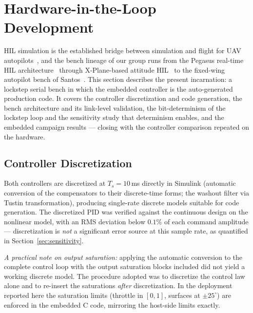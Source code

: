 \section{Hardware-in-the-Loop Development}
\label{sec:hil}
HIL simulation is the established bridge between simulation and
flight for UAV autopilots~\cite{jung2007hil,cai2009design}, and the
bench lineage of our group runs from the Pegasus real-time HIL
architecture~\cite{bittar2012pegasus} through X-Plane-based attitude
HIL~\cite{bittar2014hil} to the fixed-wing autopilot bench of
Santos~\cite{santos2018}. This section describes the present
incarnation: a lockstep serial bench in which the embedded controller
is the auto-generated production code. It covers the controller
discretization and code generation, the bench architecture and its
link-level validation, the bit-determinism of the lockstep loop and
the sensitivity study that determinism enables, and the embedded
campaign results --- closing with the controller comparison repeated
on the hardware.

\subsection{Controller Discretization}
\label{sec:discretization}
Both controllers are discretized at $T_s = 10$\,ms directly in Simulink
(automatic conversion of the compensators to their discrete-time forms;
the washout filter via Tustin transformation), producing single-rate
discrete models suitable for code generation. The discretized PID was
verified against the continuous design on the nonlinear model, with an RMS
deviation below $0.1\%$ of each command amplitude --- discretization is
\emph{not} a significant error source at this sample rate, as quantified
in Section~\ref{sec:sensitivity}.

\emph{A practical note on output saturation:} applying the automatic
conversion to the complete control loop with the output saturation blocks
included did not yield a working discrete model. The procedure adopted was
to discretize the control law alone and to re-insert the saturations
\emph{after} discretization. In the deployment reported here the
saturation limits (throttle in $[0,1]$, surfaces at $\pm 25^\circ$) are
enforced in the embedded C code, mirroring the host-side limits exactly.

